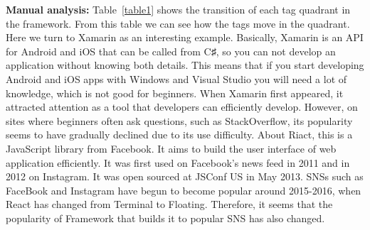 \documentclass[conference]{IEEEtran}
\begin{document}
\textbf{Manual analysis:}
Table~\ref{table1} shows the transition of each tag quadrant in the framework. From this table we can see how the tags move in the quadrant. Here we turn to Xamarin as an interesting example. Basically, Xamarin is an API for Android and iOS that can be called from C♯, so you can not develop an application without knowing both details. This means that if you start developing Android and iOS apps with Windows and Visual Studio you will need a lot of knowledge, which is not good for beginners. When Xamarin first appeared, it attracted attention as a tool that developers can efficiently develop. However, on sites where beginners often ask questions, such as StackOverflow, its popularity seems to have gradually declined due to its use difficulty.
About Riact, this is a JavaScript library from Facebook. It aims to build the user interface of web application efficiently. It was first used on Facebook's news feed in 2011 and in 2012 on Instagram. It was open sourced at JSConf US in May 2013. SNSs such as FaceBook and Instagram have begun to become popular around 2015-2016, when React has changed from Terminal to Floating. Therefore, it seems that the popularity of Framework that builds it to popular SNS has also changed.

\smallskip\smallskip
\end{document}
